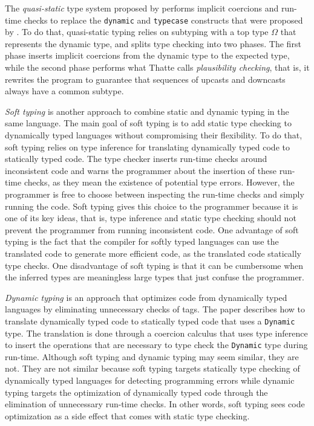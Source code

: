 \documentclass[preprint]{sig-alternate}
\begin{document}
The \textit{quasi-static} type system proposed by \citet{thatte1990qst}
performs implicit coercions and run-time checks to replace the
\texttt{dynamic} and \texttt{typecase} constructs that were proposed by
\citet{abadi1989dts}.
To do that, quasi-static typing relies on subtyping with a top type
$\Omega$ that represents the dynamic type, and splits type checking
into two phases.
The first phase inserts implicit coercions from the dynamic type to
the expected type, while the second phase performs what Thatte calls
\textit{plausibility checking}, that is, it rewrites the program to
guarantee that sequences of upcasts and downcasts always have a
common subtype.

\textit{Soft typing} \citep{cartwright1991soft} is another approach
to combine static and dynamic typing in the same language.
The main goal of soft typing is to add static type checking to
dynamically typed languages without compromising their flexibility.
To do that, soft typing relies on type inference for
translating dynamically typed code to statically typed code.
The type checker inserts run-time checks around inconsistent code and
warns the programmer about the insertion of these run-time checks,
as they mean the existence of potential type errors.
However, the programmer is free to choose between inspecting the
run-time checks and simply running the code.
Soft typing gives this choice to the programmer because it is one of
its key ideas, that is, type inference and static type checking should
not prevent the programmer from running inconsistent code.
One advantage of soft typing is the fact that the compiler for
softly typed languages can use the translated code to generate
more efficient code, as the translated code statically type checks.
One disadvantage of soft typing is that it can be cumbersome when
the inferred types are meaningless large types that just confuse the
programmer.

\textit{Dynamic typing} \citep{henglein1994dts} is an approach
that optimizes code from dynamically typed languages by eliminating
unnecessary checks of tags.
The paper describes how to translate dynamically typed code to
statically typed code that uses a \texttt{Dynamic} type.
The translation is done through a coercion calculus that uses type
inference to insert the operations that are necessary to type check
the \texttt{Dynamic} type during run-time.
Although soft typing and dynamic typing may seem similar, they are not.
They are not similar because soft typing targets statically type
checking of dynamically typed languages for detecting programming
errors while dynamic typing targets the optimization of dynamically
typed code through the elimination of unnecessary run-time checks.
In other words, soft typing sees code optimization as a side effect
that comes with static type checking.
\end{document}
